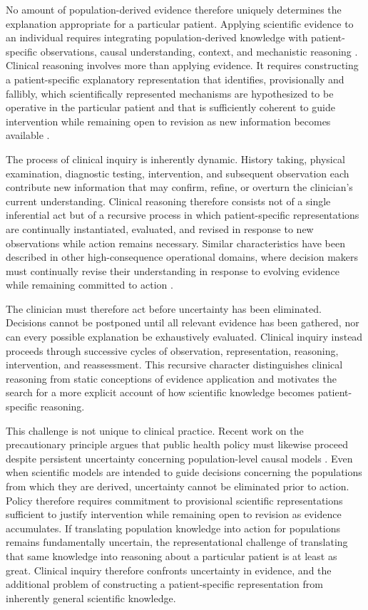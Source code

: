 \documentclass[11pt]{article}
\begin{document}
No amount of population-derived evidence therefore uniquely determines the explanation appropriate for a particular patient. Applying scientific evidence to an individual requires integrating population-derived knowledge with patient-specific observations, causal understanding, context, and mechanistic reasoning \parencite{anjum2020rethinking}. Clinical reasoning involves more than applying evidence. It requires constructing a patient-specific explanatory representation that identifies, provisionally and fallibly, which scientifically represented mechanisms are hypothesized to be operative in the particular patient and that is sufficiently coherent to guide intervention while remaining open to revision as new information becomes available \parencite{collins_dynamic_2014, collins_synthesis_2018}.

The process of clinical inquiry is inherently dynamic. History taking, physical examination, diagnostic testing, intervention, and subsequent observation each contribute new information that may confirm, refine, or overturn the clinician's current understanding. Clinical reasoning therefore consists not of a single inferential act but of a recursive process in which patient-specific representations are continually instantiated, evaluated, and revised in response to new observations while action remains necessary. Similar characteristics have been described in other high-consequence operational domains, where decision makers must continually revise their understanding in response to evolving evidence while remaining committed to action \parencite{shoemaker_flight_2023}.

The clinician must therefore act before uncertainty has been eliminated. Decisions cannot be postponed until all relevant evidence has been gathered, nor can every possible explanation be exhaustively evaluated. Clinical inquiry instead proceeds through successive cycles of observation, representation, reasoning, intervention, and reassessment. This recursive character distinguishes clinical reasoning from static conceptions of evidence application and motivates the search for a more explicit account of how scientific knowledge becomes patient-specific reasoning.

This challenge is not unique to clinical practice. Recent work on the precautionary principle argues that public health policy must likewise proceed despite persistent uncertainty concerning population-level causal models \parencite{kriebel_science_2025, kriebel_response_2008}. Even when scientific models are intended to guide decisions concerning the populations from which they are derived, uncertainty cannot be eliminated prior to action. Policy therefore requires commitment to provisional scientific representations sufficient to justify intervention while remaining open to revision as evidence accumulates. If translating population knowledge into action for populations remains fundamentally uncertain, the representational challenge of translating that same knowledge into reasoning about a particular patient is at least as great. Clinical inquiry therefore confronts uncertainty in evidence, and the additional problem of constructing a patient-specific representation from inherently general scientific knowledge. 
\end{document}
